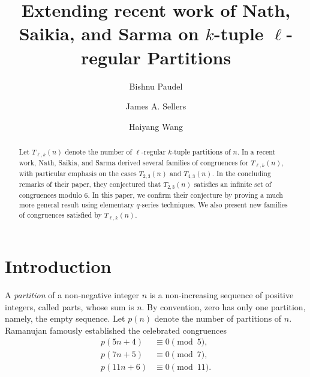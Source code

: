 \documentclass{amsart}
\theoremstyle{definition}
\begin{document}
\title[Extending recent work of Nath, Saikia, and Sarma on $k$-tuple $\ell$-regular Partitions]{Extending recent work of Nath, Saikia, and Sarma on $k$-tuple $\ell$-regular Partitions }

\author[B. Paudel]{Bishnu Paudel}

\author[J. Sellers]{James A. Sellers}

\author[H. Wang]{Haiyang Wang}

\address{Mathematics and Statistics Department\\
         University of Minnesota Duluth\\
         Duluth, MN 55812, USA}




\begin{abstract}
Let $T_{\ell,k}(n)$ denote the number of $\ell$-regular $k$-tuple partitions of $n$. In a recent work, Nath, Saikia, and Sarma derived several families of congruences for $T_{\ell,k}(n)$, with particular emphasis on the cases $T_{2,3}(n)$ and $T_{4,3}(n)$. In the concluding remarks of their paper, they conjectured that $T_{2,3}(n)$ satisfies an infinite set of congruences modulo 6. In this paper, we confirm their conjecture by proving a much more general result using elementary $q$-series techniques. We also present new families of congruences  satisfied by $T_{\ell,k}(n)$.
\end{abstract}

\maketitle

\section{Introduction}




A \textit{partition} of a non-negative integer $n$ is a non-increasing sequence of positive integers, called parts, whose sum is $n$. By convention, zero has only one partition, namely, the empty sequence. Let $p(n)$ denote the number of partitions of $n$. Ramanujan \cite{Ramanujan} famously established the celebrated congruences
\begin{align*}
	p(5n+4)&\equiv 0\pmod 5,\\
	p(7n+5)&\equiv 0\pmod 7,\\
	p(11n+6)&\equiv 0\pmod {11}.
\end{align*}
\end{document}
